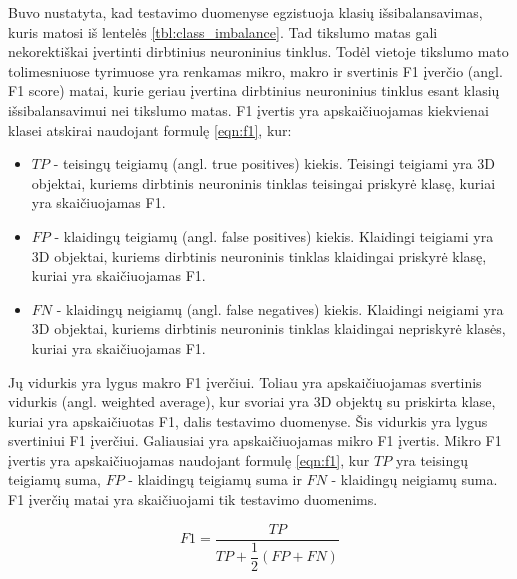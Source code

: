 Buvo nustatyta, kad testavimo duomenyse egzistuoja klasių išsibalansavimas, kuris matosi iš lentelės \ref{tbl:class_imbalance}. Tad tikslumo matas gali nekorektiškai įvertinti dirbtinius neuroninius tinklus. Todėl vietoje tikslumo mato tolimesniuose tyrimuose yra renkamas mikro, makro ir svertinis F1 įverčio (angl. F1 score) matai, kurie geriau įvertina dirbtinius neuroninius tinklus esant klasių išsibalansavimui nei tikslumo matas. F1 įvertis yra apskaičiuojamas kiekvienai klasei atskirai naudojant formulę \ref{eqn:f1}, kur:

\begin{itemize}
	\item $TP$ - teisingų teigiamų (angl. true positives) kiekis. Teisingi teigiami yra 3D objektai, kuriems dirbtinis neuroninis tinklas teisingai priskyrė klasę, kuriai yra skaičiuojamas F1.
	\item $FP$ - klaidingų teigiamų (angl. false positives) kiekis. Klaidingi teigiami yra 3D objektai, kuriems dirbtinis neuroninis tinklas klaidingai priskyrė klasę, kuriai yra skaičiuojamas F1.
	\item $FN$ - klaidingų neigiamų (angl. false negatives) kiekis. Klaidingi neigiami yra 3D objektai, kuriems dirbtinis neuroninis tinklas klaidingai nepriskyrė klasės, kuriai yra skaičiuojamas F1.
\end{itemize}

Jų vidurkis yra lygus makro F1 įverčiui. Toliau yra apskaičiuojamas svertinis vidurkis (angl. weighted average), kur svoriai yra 3D objektų su priskirta klase, kuriai yra apskaičiuotas F1, dalis testavimo duomenyse. Šis vidurkis yra lygus svertiniui F1 įverčiui. Galiausiai yra apskaičiuojamas mikro F1 įvertis. Mikro F1 įvertis yra apskaičiuojamas naudojant formulę \ref{eqn:f1}, kur $TP$ yra teisingų teigiamų suma, $FP$ - klaidingų teigiamų suma ir $FN$ - klaidingų neigiamų suma. F1 įverčių matai yra skaičiuojami tik testavimo duomenims.

\begin{equation}
\label{eqn:f1}
	F1 = \dfrac{TP}{TP + \dfrac{1}{2}(FP + FN)}
\end{equation}

